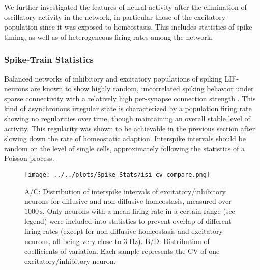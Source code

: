 \documentclass[10pt,a4paper]{article}
\begin{document}
We further investigated the features of neural activity after the elimination of oscillatory activity in the network, in particular those of the excitatory population since it was exposed to homeostasis. This includes statistics of spike timing, as well as of heterogeneous firing rates among the network.  

\subsubsection{Spike-Train Statistics}
Balanced networks of inhibitory and excitatory populations of spiking LIF-neurons are known to show highly random, uncorrelated spiking behavior under sparse connectivity with a relatively high per-synapse connection strength \cite{Vreeswijk1996,Brunel2000}. This kind of asynchronous irregular state is characterized by a population firing rate showing no regularities over time, though maintaining an overall stable level of activity. This regularity was shown to be achievable in the previous section after slowing down the rate of homeostatic adaption. Interspike intervals should be random on the level of single cells, approximately following the statistics of a Poisson process.   
\begin{figure}
\texttt{[image: ../../plots/Spike\_Stats/isi\_cv\_compare.png]}
\caption{A/C: Distribution of interspike intervals of excitatory/inhibitory neurons for diffusive and non-diffusive homeostasis, measured over $\mathrm{1000\,s}$. Only neurons with a mean firing rate in a certain range (see legend) were included into statistics to prevent overlap of different firing rates (except for non-diffusive homeostasis and excitatory neurons, all being very close to 3 Hz). B/D: Distribution of coefficients of variation. Each sample represents the CV of one excitatory/inhibitory neuron.}
\label{ISI_CV_compare}
\end{figure}
\end{document}
